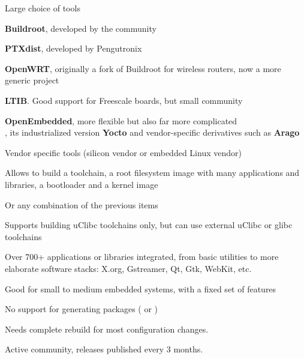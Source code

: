    Large choice of tools
  \small
  \startitemize
  \item {\bf Buildroot}, developed by the community\\
  \item {\bf PTXdist}, developed by Pengutronix\\
  \item {\bf OpenWRT}, originally a fork of Buildroot for wireless routers,
    now a more generic project\\
  \item {\bf LTIB}. Good support for Freescale boards, but small community\\
  \item {\bf OpenEmbedded}, more flexible but also far more complicated\\
    , its industrialized version {\bf
      Yocto} and vendor-specific derivatives such as {\bf Arago}
  \item Vendor specific tools (silicon vendor or embedded Linux
    vendor)
  \stopitemize

  \startitemize
  \item Allows to build a toolchain, a root filesystem image with many
    applications and libraries, a bootloader and a kernel image
    \startitemize
    \item Or any combination of the previous items
    \stopitemize
  \item Supports building uClibc toolchains only, but can use external
    uClibc or glibc toolchains
  \item Over 700+ applications or libraries integrated, from basic
    utilities to more elaborate software stacks: X.org, Gstreamer, Qt,
    Gtk, WebKit, etc.
  \item Good for small to medium embedded systems, with a fixed set of
    features
    \startitemize
    \item No support for generating packages ( or )
    \item Needs complete rebuild for most configuration changes.
    \stopitemize
  \item Active community, releases published every 3 months.
  \stopitemize


